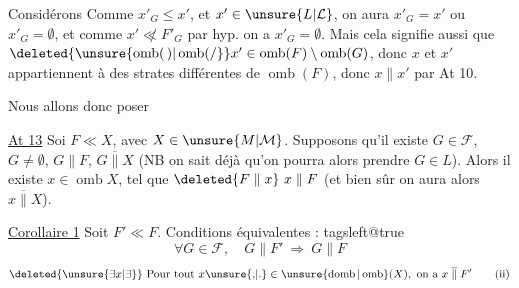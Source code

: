 Considérons
Comme $x'_G\leq x'$, et $x'\in\unsure{L|\mathcal L}$, on aura $x'_G=x'$ ou $x'_G=\emptyset$, et comme $x'\not\ll F'_G$ par hyp. on a $x'_G=\emptyset$. Mais cela signifie aussi que $\deleted{\unsure{\operatorname{omb}(\,)|\operatorname{omb}(/}}x'\in\operatorname{omb}(F)\setminus\operatorname{omb}(G)$, donc $x$ et $x'$ appartiennent à des strates  différentes de $\operatorname{omb}(F)$, donc $x\parallel x'$ par At 10.

Nous allons donc poser

\uline{At 13} \quad Soi $F\ll X$, avec $X\in\unsure{M|\mathcal M}$.
 Supposons qu'il existe $G\in\mathcal F$, $G\neq\emptyset$, $G\parallel F$, $G\mathrel{\overline{\parallel}}X$ (NB on  sait déjà qu'on pourra alors prendre $G\in L$). Alors il existe $x\in\operatorname{omb} X$, tel que $\deleted{F\parallel x}\ x\parallel F$ (et bien sûr on aura alors $x\mathrel{\overline{\parallel}}X$).

\uline{Corollaire 1} \quad Soit $F'\ll F$. Conditions équivalentes :
\begingroup\csname tagsleft@true\endcsname
\[
\forall G\in\mathcal F,\quad G\parallel F'\ \Longrightarrow\ G\parallel F
\tag*{(i)}
\]
\[
\deleted{\unsure{\exists x|\exists}} \ \text{Pour tout }x\unsure{{,}|{.}}\in\unsure{\operatorname{domb}|\operatorname{omb}}(X),\ \text{on a }x\mathrel{\overline{\parallel}}F'
\tag*{(ii)}
\]
\endgroup
